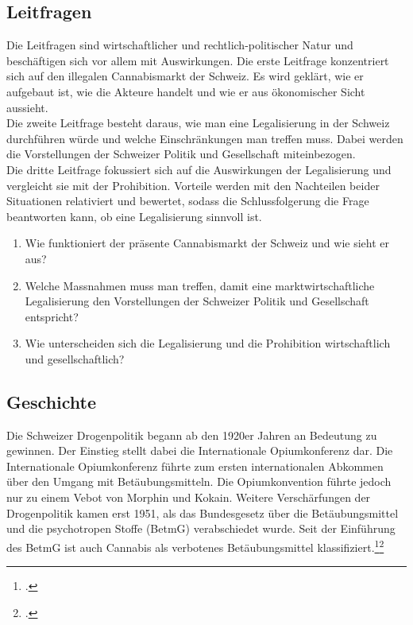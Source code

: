 \documentclass[../main.tex]{subfiles}
\begin{document}
	 \subsection{Leitfragen}
	 Die Leitfragen sind wirtschaftlicher und rechtlich-politischer Natur und beschäftigen sich vor allem mit Auswirkungen.
	 Die erste Leitfrage konzentriert sich auf den illegalen Cannabismarkt der Schweiz.
	 Es wird geklärt, wie er aufgebaut ist, wie die Akteure handelt und wie er aus ökonomischer Sicht aussieht.\\
	 
	 \noindent
	 Die zweite Leitfrage besteht daraus, wie man eine Legalisierung in der Schweiz durchführen würde und welche Einschränkungen man treffen muss.
	 Dabei werden die Vorstellungen der Schweizer Politik und Gesellschaft miteinbezogen.\\
	 
	 \noindent
	 Die dritte Leitfrage fokussiert sich auf die Auswirkungen der Legalisierung und vergleicht sie mit der Prohibition. 
	 Vorteile werden mit den Nachteilen beider Situationen relativiert und bewertet, sodass die Schlussfolgerung die Frage beantworten kann, ob eine Legalisierung sinnvoll ist.

	 
	 \begin{enumerate}
	 	\item Wie funktioniert der präsente Cannabismarkt der Schweiz und wie sieht er aus?
	 	 
	 	\item Welche Massnahmen muss man treffen, damit eine marktwirtschaftliche Legalisierung den Vorstellungen der Schweizer Politik und Gesellschaft entspricht?
	 
	 	\item Wie unterscheiden sich die Legalisierung und die Prohibition wirtschaftlich und gesellschaftlich?
	 \end{enumerate}
	
	 
	 \subsection{Geschichte}
	 Die Schweizer Drogenpolitik begann ab den 1920er Jahren an Bedeutung zu gewinnen. 
	 Der Einstieg stellt dabei die Internationale Opiumkonferenz dar. 
	 Die Internationale Opiumkonferenz führte zum ersten internationalen Abkommen über den Umgang mit Betäubungsmitteln. 
	 Die Opiumkonvention führte jedoch nur zu einem Vebot von Morphin und Kokain. 
	 Weitere Verschärfungen der Drogenpolitik kamen erst 1951, als das Bundesgesetz über die Betäubungsmittel und die psychotropen Stoffe (BetmG) verabschiedet wurde.
	 Seit der Einführung des BetmG ist auch Cannabis als verbotenes Betäubungsmittel klassifiziert.\footcite{brassel}\footcite{admin-01}\\
	 	 
\end{document}
